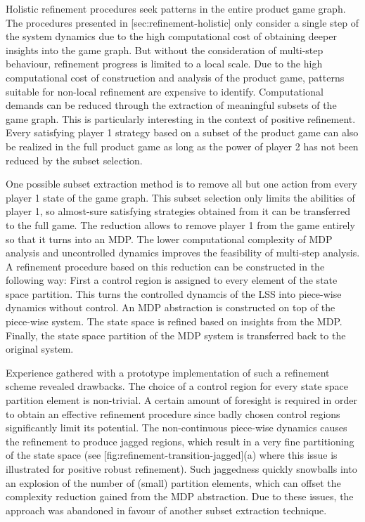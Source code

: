 Holistic refinement procedures seek patterns in the entire product game graph.
The procedures presented in [sec:refinement-holistic] only consider a single step of the system dynamics due to the high computational cost of obtaining deeper insights into the game graph.
But without the consideration of multi-step behaviour, refinement progress is limited to a local scale.
Due to the high computational cost of construction and analysis of the product game, patterns suitable for non-local refinement are expensive to identify.
Computational demands can be reduced through the extraction of meaningful subsets of the game graph.
This is particularly interesting in the context of positive refinement.
Every satisfying player 1 strategy based on a subset of the product game can also be realized in the full product game as long as the power of player 2 has not been reduced by the subset selection.

One possible subset extraction method is to remove all but one action from every player 1 state of the game graph.
This subset selection only limits the abilities of player 1, so almost-sure satisfying strategies obtained from it can be transferred to the full game.
The reduction allows to remove player 1 from the game entirely so that it turns into an MDP.
The lower computational complexity of MDP analysis and uncontrolled dynamics improves the feasibility of multi-step analysis.
A refinement procedure based on this reduction can be constructed in the following way:
First a control region is assigned to every element of the state space partition.
This turns the controlled dynamcis of the LSS into piece-wise dynamics without control.
An MDP abstraction is constructed on top of the piece-wise system.
The state space is refined based on insights from the MDP.
Finally, the state space partition of the MDP system is transferred back to the original system.

Experience gathered with a prototype implementation of such a refinement scheme revealed drawbacks.
The choice of a control region for every state space partition element is non-trivial.
A certain amount of foresight is required in order to obtain an effective refinement procedure since badly chosen control regions significantly limit its potential.
The non-continuous piece-wise dynamics causes the refinement to produce jagged regions, which result in a very fine partitioning of the state space (see [fig:refinement-transition-jagged](a) where this issue is illustrated for positive robust refinement).
Such jaggedness quickly snowballs into an explosion of the number of (small) partition elements, which can offset the complexity reduction gained from the MDP abstraction.
Due to these issues, the approach was abandoned in favour of another subset extraction technique.

